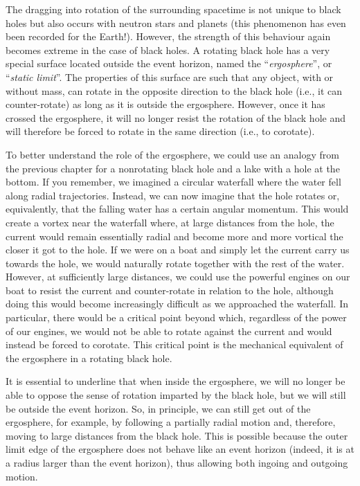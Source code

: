 The dragging into rotation of the surrounding spacetime is not unique to black holes but
also occurs with neutron stars and planets (this phenomenon has even been recorded for
the Earth!). However, the strength of this behaviour again becomes extreme in the case
of black holes. A rotating black hole has a very special surface located outside the
event horizon, named the
``\emph{ergosphere}'', or ``\emph{static
limit}''. The properties of this surface are such that any object,
with or without mass, can rotate in the opposite direction to the black hole (i.e., it
can counter-rotate) as long as it is outside the ergosphere. However,
once it has crossed the ergosphere, it will no longer resist the rotation of the black
hole and will therefore be forced to rotate in the same direction (i.e., to corotate).

To better understand the role of the ergosphere, we could use an analogy from the
previous chapter for a nonrotating black hole and a lake with a hole at the bottom. If
you remember, we imagined a circular waterfall where the water fell along radial
trajectories. Instead, we can now imagine that the hole rotates or, equivalently, that
the falling water has a certain angular momentum. This would create a vortex near the
waterfall where, at large distances from the hole, the current would remain essentially
radial and become more and more vortical the closer it got to the hole. If we were on a
boat and simply let the current carry us towards the hole, we would naturally rotate
together with the rest of the water. However, at sufficiently large distances, we could
use the powerful engines on our boat to resist the current and counter-rotate in
relation to the hole, although doing this would become increasingly difficult as we
approached the waterfall. In particular, there would be a critical point beyond which,
regardless of the power of our engines, we would not be able to rotate against the
current and would instead be forced to corotate. This critical point is the mechanical
equivalent of the ergosphere in a rotating black hole.

It is essential to underline that when inside the ergosphere, we will no longer be able
to oppose the sense of rotation imparted by the black hole, but we will still be outside
the event horizon. So, in principle, we can still get out of the ergosphere, for
example, by following a partially radial motion and, therefore, moving to large
distances from the black hole. This is possible because the outer limit edge of the
ergosphere does not behave like an event horizon (indeed, it is at a
radius larger than the event horizon), thus allowing both ingoing and outgoing motion.

